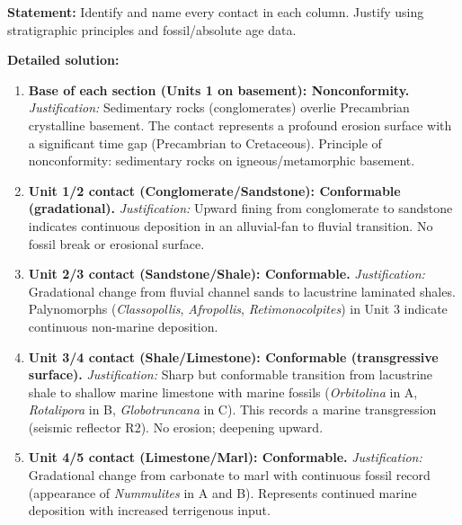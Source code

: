 \documentclass[11pt]{article}
\newcommand{\cle}[1]{{\popxbold\color{popdark}#1}}
\begin{document}
\begin{exoresolu}
\textbf{Statement:} Identify and name every contact in each column. Justify using stratigraphic principles and fossil/absolute age data.

\tcblower
\textbf{Detailed solution:}
\begin{enumerate}
    \item \textbf{Base of each section (Units 1 on basement): Nonconformity.} 
    \emph{Justification:} Sedimentary rocks (conglomerates) overlie Precambrian crystalline basement. The contact represents a profound erosion surface with a significant time gap (Precambrian to Cretaceous). Principle of \cle{nonconformity}: sedimentary rocks on igneous/metamorphic basement.
    
    \item \textbf{Unit 1/2 contact (Conglomerate/Sandstone): Conformable (gradational).} 
    \emph{Justification:} Upward fining from conglomerate to sandstone indicates continuous deposition in an alluvial-fan to fluvial transition. No fossil break or erosional surface.
    
    \item \textbf{Unit 2/3 contact (Sandstone/Shale): Conformable.} 
    \emph{Justification:} Gradational change from fluvial channel sands to lacustrine laminated shales. Palynomorphs (\emph{Classopollis}, \emph{Afropollis}, \emph{Retimonocolpites}) in Unit 3 indicate continuous non-marine deposition.
    
    \item \textbf{Unit 3/4 contact (Shale/Limestone): Conformable (transgressive surface).} 
    \emph{Justification:} Sharp but conformable transition from lacustrine shale to shallow marine limestone with marine fossils (\emph{Orbitolina} in A, \emph{Rotalipora} in B, \emph{Globotruncana} in C). This records a marine transgression (seismic reflector R2). No erosion; deepening upward.
    
    \item \textbf{Unit 4/5 contact (Limestone/Marl): Conformable.} 
    \emph{Justification:} Gradational change from carbonate to marl with continuous fossil record (appearance of \emph{Nummulites} in A and B). Represents continued marine deposition with increased terrigenous input.
    

\end{enumerate}
\end{exoresolu}
\end{document}

